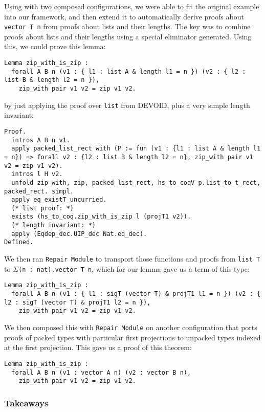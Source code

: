 Using \toolname with two composed configurations, we were able to fit the original example into our framework,
and then extend it to automatically derive proofs about \lstinline{vector T n} from proofs about lists and their lengths.
The key was to combine proofs about lists and their lengths using a special eliminator \toolname generated.
Using this, we could prove this lemma:

\begin{lstlisting}
Lemma zip_with_is_zip :
  forall A B n (v1 : { l1 : list A & length l1 = n }) (v2 : { l2 : list B & length l2 = n }),
    zip_with pair v1 v2 = zip v1 v2.
\end{lstlisting}
by just applying the proof over \lstinline{list} from DEVOID, plus a very simple length invariant:

\begin{lstlisting}
Proof.
  intros A B n v1. 
  apply packed_list_rect with (P := fun (v1 : {l1 : list A & length l1 = n}) => forall v2 : {l2 : list B & length l2 = n}, zip_with pair v1 v2 = zip v1 v2).
  intros l H v2.
  unfold zip_with, zip, packed_list_rect, hs_to_coqV_p.list_to_t_rect, packed_rect. simpl.
  apply eq_existT_uncurried.
  (* list proof: *)
  exists (hs_to_coq.zip_with_is_zip l (projT1 v2)).
  (* length invariant: *)
  apply (Eqdep_dec.UIP_dec Nat.eq_dec).
Defined.
\end{lstlisting}
We then ran \lstinline{Repair Module} to transport those functions and proofs from \lstinline{list T}
to $\Sigma$\lstinline{(n : nat).vector T n}, which for our lemma gave us a term of this type:

\begin{lstlisting}
Lemma zip_with_is_zip :
  forall A B n (v1 : { l1 : sigT (vector T) & projT1 l1 = n }) (v2 : { l2 : sigT (vector T) & projT1 l2 = n }),
    zip_with pair v1 v2 = zip v1 v2.
\end{lstlisting}
We then composed this with \lstinline{Repair Module} on another configuration that ports proofs of
packed types with particular first projections to unpacked types indexed at the first projection.
This gave us a proof of this theorem:

\begin{lstlisting}
Lemma zip_with_is_zip :
  forall A B n (v1 : vector A n) (v2 : vector B n),
    zip_with pair v1 v2 = zip v1 v2.
\end{lstlisting}

\subsubsection{Takeaways}


